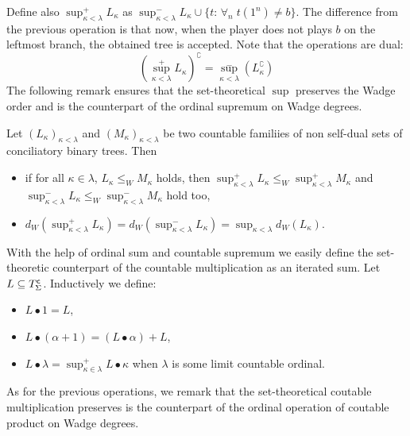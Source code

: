 Define also
$\sup^+ _{\kappa<\lambda} L_\kappa$ as $\sup^-_{\kappa<\lambda} L_\kappa\cup \{t :\, \forall_n\; t(1^n)\neq b\}$.
The difference from the previous operation is that now, when the
player does not plays $b$ on the leftmost branch, the obtained tree is
accepted. Note that the operations are dual: 
$$\left ( \sup_{\kappa<\lambda}^+ L_\kappa \right )^\complement = \sup^-_{\kappa<\lambda} \left ( L_\kappa^\complement
\right )$$
The following remark ensures that the set-theoretical $\sup$ preserves the Wadge order and is the counterpart of the ordinal supremum on Wadge degrees.
\begin{remark}
\label{r_sup}
Let $(L_\kappa)_{\kappa<\lambda}$ and $(M_\kappa)_{\kappa<\lambda}$ be two countable familiies of non self-dual sets of conciliatory binary trees. Then
\begin{itemize}
\item if for all $\kappa \in \lambda$, $L_\kappa \leq_W M_\kappa$ holds, 
then $\sup^+_{\kappa<\lambda} L_\kappa \leq_W \sup^+_{\kappa<\lambda} M_\kappa$ and $\sup^-_{\kappa<\lambda} L_\kappa \leq_W \sup^-_{\kappa<\lambda} M_\kappa$
 hold too,
\item$d_W(\sup^+ _{\kappa<\lambda} L_\kappa)= d_W(\sup^- _{\kappa<\lambda} L_\kappa)=\sup_{\kappa<\lambda}d_W( L_\kappa)$.
\end{itemize}
\end{remark}




\vspace{0.2cm}
 \hspace{0.1cm}
With the help of ordinal sum and countable supremum we easily define the set-theoretic counterpart of the countable multiplication as an iterated sum. 
Let $L \subseteq  T^{\sf c}_{\Sigma} $.  Inductively we define: 
\begin{itemize}
\item $L \bullet 1 = L$, 
\item $L \bullet (\alpha + 1) = (L \bullet \alpha)+L$, 
\item $L \bullet \lambda = \sup^+_{\kappa \in \lambda} L \bullet \kappa$ when $\lambda$  is some limit countable ordinal.
\end{itemize}

As for the previous operations, we remark that   the set-theoretical coutable multiplication preserves is the counterpart of the ordinal operation of coutable product  on Wadge degrees.

